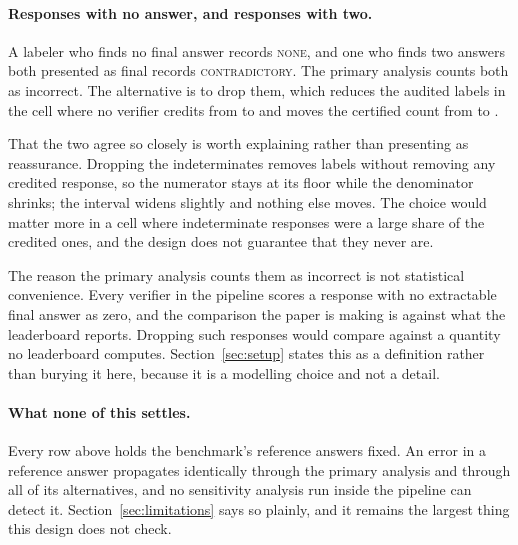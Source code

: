 \paragraph{Responses with no answer, and responses with two.}
A labeler who finds no final answer records \textsc{none}, and one who finds two answers both
presented as final records \textsc{contradictory}. The primary analysis counts both as
incorrect. The alternative is to drop them, which reduces the audited labels in the cell where
no verifier credits from \AuditNRejectAll{} to \SensDropNRejectAll{} and moves the certified
count from \CertEpsZero{} to \SensDropCombined{}.

That the two agree so closely is worth explaining rather than presenting as reassurance.
Dropping the indeterminates removes labels without removing any credited response, so the
numerator stays at its floor while the denominator shrinks; the interval widens slightly and
nothing else moves. The choice would matter more in a cell where indeterminate responses were
a large share of the credited ones, and the design does not guarantee that they never are.

The reason the primary analysis counts them as incorrect is not statistical convenience. Every
verifier in the pipeline scores a response with no extractable final answer as zero, and the
comparison the paper is making is against what the leaderboard reports. Dropping such
responses would compare against a quantity no leaderboard computes. Section~\ref{sec:setup}
states this as a definition rather than burying it here, because it is a modelling choice and
not a detail.

\paragraph{What none of this settles.}
Every row above holds the benchmark's reference answers fixed. An error in a reference answer
propagates identically through the primary analysis and through all of its alternatives, and
no sensitivity analysis run inside the pipeline can detect it.
Section~\ref{sec:limitations} says so plainly, and it remains the largest thing this design
does not check.
